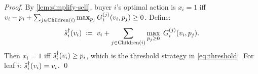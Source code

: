\begin{proof}
By \cref{lem:simplify-sell}, buyer $i$'s optimal action is $x_i = 1$ iff $v_i - p_i + \sum_{j \in \operatorname{Children}(i)} \max_{p_j} G^{(j)}_i(v_i, p_j) \ge 0$. Define:
\[
\tilde{s}^\dagger_i(v_i) \;\coloneqq\; v_i + \sum_{j \in \operatorname{Children}(i)} \max_{p_j \ge 0}\; G^{(j)}_i(v_i, p_j).
\]
Then $x_i = 1$ iff $\tilde{s}^\dagger_i(v_i) \ge p_i$, which is the threshold strategy in \cref{eq:threshold}. For leaf $i$: $\tilde{s}^\dagger_i(v_i) = v_i$.
\qed
\end{proof}
